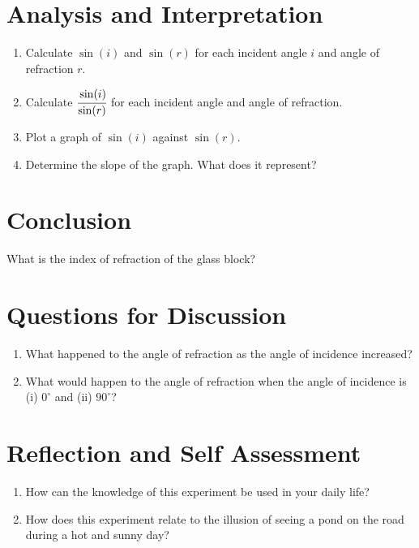 \section{Analysis and Interpretation}
\begin{enumerate}
\item Calculate $\sin(i)$ and $\sin(r)$ for each incident angle $i$ and angle of refraction $r$.  
\item Calculate $\cfrac{\sin(i)}{\sin(r)}$ for each incident angle and angle of refraction. 
\item Plot a graph of $\sin(i)$ against $\sin(r)$.
\item Determine the slope of the graph. What does it represent?
\end{enumerate}

\section{Conclusion}
What is the index of refraction of the glass block?

\section{Questions for Discussion}
\begin{enumerate}
\item What happened to the angle of refraction as the angle of incidence increased?
\item What would happen to the angle of refraction when the angle of incidence is (i) $0^\circ$ and (ii) $90^\circ$?
\end{enumerate}

\section{Reflection and Self Assessment}
\begin{enumerate}
\item How can the knowledge of this experiment be used in your daily life? 
\item How does this experiment relate to the illusion of seeing a pond on the road during a hot and sunny day?
\end{enumerate}